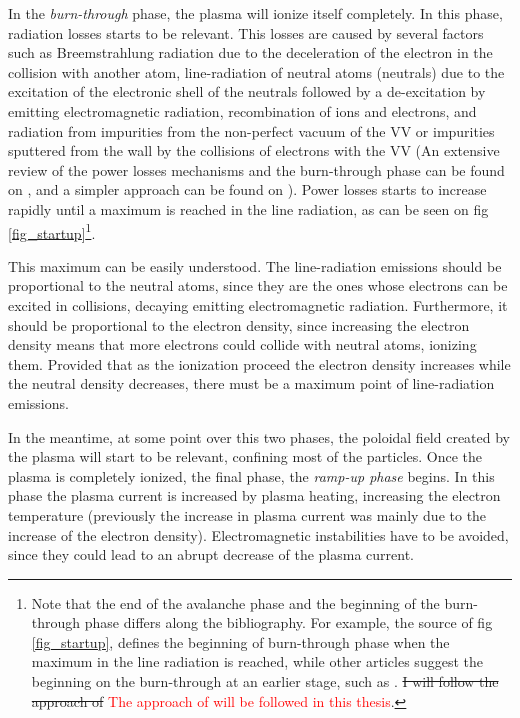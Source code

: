 \documentclass[a4paper,12pt,oneside]{book}
\begin{document}
In the \textit{burn-through} phase, the plasma will ionize itself completely. In this phase, radiation losses starts to be relevant. This losses are caused by several factors such as Breemstrahlung radiation due to the deceleration of the electron in the collision with another atom, line-radiation of neutral atoms (neutrals) due to the excitation of the electronic shell of the neutrals followed by a de-excitation by emitting electromagnetic radiation, recombination of ions and electrons, and radiation from impurities from the non-perfect vacuum of the VV or impurities sputtered from the wall by the collisions of electrons with the VV (An extensive review of the power losses mechanisms and the burn-through phase can be found on \cite{KimThesis}, and a simpler approach can be found on \cite{Lloyd_1996}). Power losses starts to increase rapidly until a maximum is reached in the line radiation, as can be seen on fig \ref{fig_startup}\footnote{Note that the end of the avalanche phase and the beginning of the burn-through phase differs along the bibliography. For example, the source of fig \ref{fig_startup}, \cite{TCV_thesis} defines the beginning of burn-through phase when the maximum in the line radiation is reached, while other articles suggest the beginning on the burn-through at an earlier stage, such as \cite{ITER_2019}. \st{I will follow the approach of}\cite{ITER_2019} \textcolor{red}{The approach of \cite{ITER_2019} will be followed in this thesis}.}.

This maximum can be easily understood. The line-radiation emissions should be proportional to the neutral atoms, since they are the ones whose electrons can be excited in collisions, decaying emitting electromagnetic radiation. Furthermore, it should be proportional to the electron density, since increasing the electron density means that more electrons could collide with neutral atoms, ionizing them. Provided that as the ionization proceed the electron density increases while the neutral density decreases, there must be a maximum point of line-radiation emissions.

In the meantime, at some point over this two phases, the poloidal field created by the plasma will start to be relevant, confining most of the particles. Once the plasma is completely ionized, the final phase, the \textit{ramp-up phase} begins. In this phase the plasma current is increased by plasma heating, increasing the electron temperature (previously the increase in plasma current was mainly due to the increase of the electron density). Electromagnetic instabilities have to be avoided, since they could lead to an abrupt decrease of the plasma current.
%
%
\end{document}
